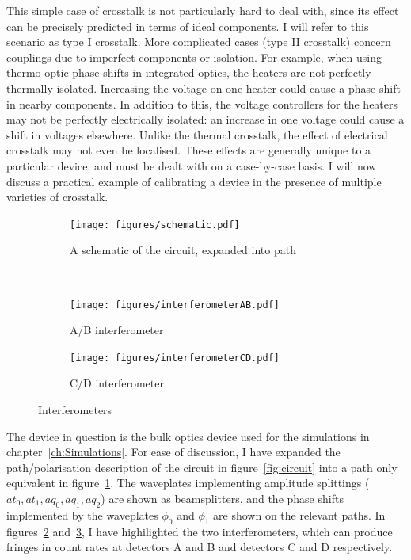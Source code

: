 This simple case of crosstalk is not particularly hard to deal with, since its
effect can be precisely predicted in terms of ideal components. I will refer to
this scenario as type I crosstalk. More complicated cases (type II crosstalk)
concern couplings due to imperfect components or
isolation. For example, when using thermo-optic phase shifts in integrated
optics, the heaters are not perfectly thermally isolated. Increasing the voltage
on one heater could cause a phase shift in nearby components. In addition to
this, the
voltage controllers for the heaters may not be perfectly electrically isolated:
an increase in one voltage could cause a shift in voltages elsewhere. Unlike the
thermal crosstalk, the effect of electrical crosstalk may not even be
localised. These effects are generally unique to a particular device, and must
be dealt with on a case-by-case basis. I will now discuss a practical example of
calibrating a device in the presence of multiple varieties of crosstalk.

\begin{figure}[t]
  \centering
  \begin{subfigure}{\textwidth}
    \texttt{[image: figures/schematic.pdf]}
    \caption{A schematic of the circuit, expanded into path}
    \label{fig:schematic}
  \end{subfigure} \\
  \vspace{1cm}
  \begin{subfigure}{0.45\textwidth}
    \texttt{[image: figures/interferometerAB.pdf]}
    \caption{A/B interferometer}
    \label{fig:ab}
  \end{subfigure}
  \hspace{0.05\textwidth}
  \begin{subfigure}{0.45\textwidth}
    \texttt{[image: figures/interferometerCD.pdf]}
    \caption{C/D interferometer}
    \label{fig:cd}
  \end{subfigure}
  \caption[Illustration of nested interferometers in the bulk Reck scheme]
  {Interferometers}
  \label{fig:interferometers}
\end{figure}

The device in question is the bulk optics device used for the simulations in
chapter~\ref{ch:Simulations}. For ease of discussion, I have expanded the
path/polarisation description of the circuit in figure~\ref{fig:circuit} into a
path only equivalent in figure~\ref{fig:schematic}. The waveplates implementing
amplitude splittings (\(at_{0}, at_{1}, aq_{0}, aq_{1}, aq_{2}\)) are shown as
beamsplitters, and the phase shifts implemented by the waveplates \(\phi_{0}\)
and \(\phi_{1}\) are shown on the relevant paths. In figures~\ref{fig:ab}
and~\ref{fig:cd}, I have highilighted the two interferometers, which can produce
fringes in count rates at detectors A and B and detectors C and D respectively.

